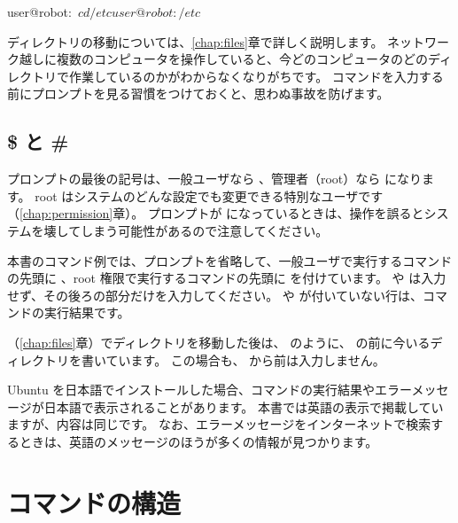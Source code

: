 \begin{terminal}[移動するとプロンプトが変わる]
user@robot:~$ cd /etc
user@robot:/etc$
\end{terminal}

ディレクトリの移動については、\ref{chap:files}章で詳しく説明します。
ネットワーク越しに複数のコンピュータを操作していると、今どのコンピュータのどのディレクトリで作業しているのかがわからなくなりがちです。
コマンドを入力する前にプロンプトを見る習慣をつけておくと、思わぬ事故を防げます。

\subsection{\$ と \#}

プロンプトの最後の記号は、一般ユーザなら \cmd{\$}、管理者（root）なら \cmd{\#} になります。
root はシステムのどんな設定でも変更できる特別なユーザです（\ref{chap:permission}章）。
プロンプトが \cmd{\#} になっているときは、操作を誤るとシステムを壊してしまう可能性があるので注意してください。

\begin{point}[本書でのコマンドの表記]
  本書のコマンド例では、プロンプトを省略して、一般ユーザで実行するコマンドの先頭に \cmd{\$}、root 権限で実行するコマンドの先頭に \cmd{\#} を付けています。
  \cmd{\$} や \cmd{\#} は入力せず、その後ろの部分だけを入力してください。
  \cmd{\$} や \cmd{\#} が付いていない行は、コマンドの実行結果です。
  （\ref{chap:files}章）でディレクトリを移動した後は、 のように、\cmd{\$} の前に今いるディレクトリを書いています。
  この場合も、\cmd{\$} から前は入力しません。
\end{point}

\begin{caution}[表示される言語について]
  Ubuntu を日本語でインストールした場合、コマンドの実行結果やエラーメッセージが日本語で表示されることがあります。
  本書では英語の表示で掲載していますが、内容は同じです。
  なお、エラーメッセージをインターネットで検索するときは、英語のメッセージのほうが多くの情報が見つかります。
\end{caution}

\section{コマンドの構造}
\label{sec:terminal-command-structure}

